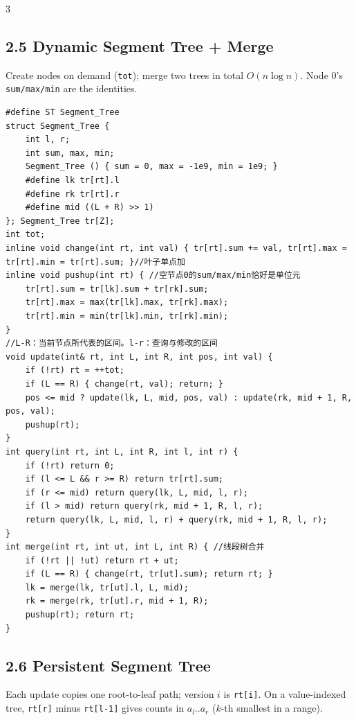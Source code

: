 \documentclass[8pt]{extarticle}
\begin{document}
\begin{multicols*}{3}
\subsection*{2.5 Dynamic Segment Tree + Merge}

Create nodes on demand (\texttt{tot}); merge two trees in total $O(n \log n)$. Node 0's \texttt{sum/max/min} are the identities.


\begin{lstlisting}
#define ST Segment_Tree
struct Segment_Tree {
    int l, r;
    int sum, max, min;
    Segment_Tree () { sum = 0, max = -1e9, min = 1e9; }
    #define lk tr[rt].l
    #define rk tr[rt].r
    #define mid ((L + R) >> 1)
}; Segment_Tree tr[Z];
int tot;
inline void change(int rt, int val) { tr[rt].sum += val, tr[rt].max = tr[rt].min = tr[rt].sum; }//叶子单点加
inline void pushup(int rt) { //空节点0的sum/max/min恰好是单位元
    tr[rt].sum = tr[lk].sum + tr[rk].sum;
    tr[rt].max = max(tr[lk].max, tr[rk].max);
    tr[rt].min = min(tr[lk].min, tr[rk].min);
}
//L-R：当前节点所代表的区间。l-r：查询与修改的区间
void update(int& rt, int L, int R, int pos, int val) {
    if (!rt) rt = ++tot;
    if (L == R) { change(rt, val); return; }
    pos <= mid ? update(lk, L, mid, pos, val) : update(rk, mid + 1, R, pos, val);
    pushup(rt);
}
int query(int rt, int L, int R, int l, int r) {
    if (!rt) return 0;
    if (l <= L && r >= R) return tr[rt].sum;
    if (r <= mid) return query(lk, L, mid, l, r);
    if (l > mid) return query(rk, mid + 1, R, l, r);
    return query(lk, L, mid, l, r) + query(rk, mid + 1, R, l, r);
}
int merge(int rt, int ut, int L, int R) { //线段树合并
    if (!rt || !ut) return rt + ut;
    if (L == R) { change(rt, tr[ut].sum); return rt; }
    lk = merge(lk, tr[ut].l, L, mid);
    rk = merge(rk, tr[ut].r, mid + 1, R);
    pushup(rt); return rt;
}
\end{lstlisting}

\subsection*{2.6 Persistent Segment Tree}

Each update copies one root-to-leaf path; version $i$ is \texttt{rt[i]}. On a value-indexed tree, \texttt{rt[r]} minus \texttt{rt[l-1]} gives counts in $a_l..a_r$ ($k$-th smallest in a range).



\end{multicols*}
\end{document}
